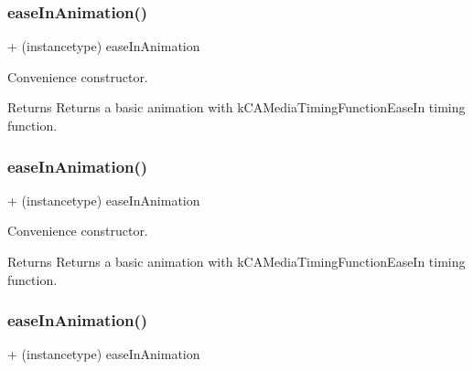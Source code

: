\subsubsection{\texorpdfstring{ease\+In\+Animation()}{easeInAnimation()}\hspace{0.1cm}{\footnotesize\ttfamily [1/3]}}
{\footnotesize\ttfamily + (instancetype) ease\+In\+Animation \begin{DoxyParamCaption}{ }\end{DoxyParamCaption}}

Convenience constructor. \begin{DoxyReturn}{Returns}
Returns a basic animation with k\+C\+A\+Media\+Timing\+Function\+Ease\+In timing function. 
\end{DoxyReturn}
\mbox{\label{interface_p_o_p_basic_animation_a19baa1e60760e093db39511258f2a4fe}} 
\subsubsection{\texorpdfstring{ease\+In\+Animation()}{easeInAnimation()}\hspace{0.1cm}{\footnotesize\ttfamily [2/3]}}
{\footnotesize\ttfamily + (instancetype) ease\+In\+Animation \begin{DoxyParamCaption}{ }\end{DoxyParamCaption}}

Convenience constructor. \begin{DoxyReturn}{Returns}
Returns a basic animation with k\+C\+A\+Media\+Timing\+Function\+Ease\+In timing function. 
\end{DoxyReturn}
\mbox{\label{interface_p_o_p_basic_animation_a19baa1e60760e093db39511258f2a4fe}} 
\subsubsection{\texorpdfstring{ease\+In\+Animation()}{easeInAnimation()}\hspace{0.1cm}{\footnotesize\ttfamily [3/3]}}
{\footnotesize\ttfamily + (instancetype) ease\+In\+Animation \begin{DoxyParamCaption}{ }\end{DoxyParamCaption}}

